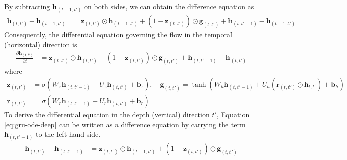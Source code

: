 \documentclass{article} %
\newcommand{\bz}{\mathbf{z}}
\newcommand{\bg}{\mathbf{g}}
\newcommand{\bh}{\mathbf{h}}
\newcommand{\bb}{\mathbf{b}}
\newcommand{\br}{\mathbf{r}}
\begin{document}
By subtracting $\bh_{(t-1,t')}$ on both sides, we can obtain  the difference equation as 
\begin{equation}
    \begin{aligned} 
    \bh_{(t,t')} - \bh_{(t-1,t')} &= \bz_{(t,t')} \odot \bh_{(t-1,t')}  + (1-\bz_{(t,t')})\odot\bg_{(t,t')} +\bh_{(t,t'-1)} - \bh_{(t-1,t')} 
    \end{aligned}
\end{equation}
Consequently, the  differential equation governing the flow in the temporal (horizontal) direction is 
\begin{equation}
    \begin{aligned} 
    \frac{\partial \bh_{(t,t')}}{\partial t} &= \bz_{(t,t')} \odot \bh_{(t,t')}  + (1-\bz_{(t,t')})\odot\bg_{(t,t')} +\bh_{(t,t'-1)} - \bh_{(t,t')}
    \end{aligned}
    \label{eq:cdrnde1}
\end{equation}
where 
\begin{equation}
    \begin{aligned}
    \bz_{(t,t')} &= \sigma(W_z\bh_{(t,t'-1)} + U_z\bh_{(t,t')} + \bb_z)\nonumber, \quad
    \bg_{(t,t')} = \tanh(W_h\bh_{(t,t'-1)} + U_h(\br_{(t,t')} \odot \bh_{t,t'}) + \bb_h) \\
    \br_{(t,t')} &= \sigma(W_r\bh_{(t,t'-1)} + U_r\bh_{(t,t')} + \bb_r) \nonumber 
    \end{aligned}
\end{equation}
To derive the differential equation in the  depth (vertical) direction $t'$, Equation \ref{eq:gru-ode-deep} can be written as a difference equation by carrying the term $\bh_{(t,t'-1)}$ to the left hand side. 
\begin{equation}
    \begin{aligned}
    \bh_{(t,t')} - \bh_{(t,t'-1)} &= \bz_{(t,t')} \odot \bh_{(t-1,t')}  + (1-\bz_{(t,t')})\odot\bg_{(t,t')} \\
    \end{aligned}
\end{equation}
\end{document}
